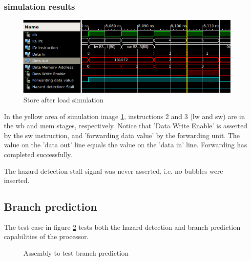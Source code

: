 \subsubsection*{simulation results}

\begin{figure}[H]
  \begin{center}
    \includegraphics[width=\textwidth]{assets/lw-sw-forwarding.png}
  \end{center}
  \caption{
    Store after load simulation}
  \label{fig:simulate_lw_sw}
\end{figure}

In the yellow area of simulation image \ref{fig:simulate_lw_sw}, instructions 2 and 3 (lw and sw) are in the wb and mem stages, respectively.
Notice that 'Data Write Enable' is asserted by the sw instruction, and 'forwarding data value' by the forwarding unit.
The value on the 'data out' line equals the value on the 'data in' line. Forwarding has completed successfully.

The hazard detection stall signal was never asserted, i.e. no bubbles were inserted.

\subsection{Branch prediction}

The test case in figure \ref{fig:test-branch-prediction} tests both the hazard detection and branch prediction capabilities of the processor.

\begin{figure}[H]
  \caption{Assembly to test branch prediction} \label{fig:test-branch-prediction}
\end{figure}

